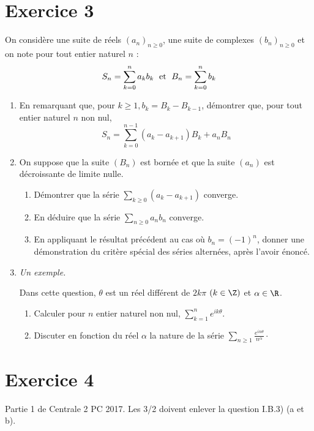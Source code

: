 \documentclass[a4paper,french,11pt,twoside]{VcCours}
\begin{document}
\medskip

\section*{Exercice 3}
On considère une suite de réels $(a_n)_{n \geq 0}$, une suite de complexes $(b_n)_{n \geq 0}$ et on note pour tout entier naturel $n$ :
   $$S_n=\sum_{k=0}^n a_kb_k \; \hbox{ et } \; B_n=\sum_{k=0}^n b_k$$
   \begin{enumerate}
\item En remarquant que, pour $k \geq 1, b_k=B_k-B_{k-1}$, démontrer que, pour tout entier naturel $n$ non nul,
   $$S_n=\sum_{k=0}^{n-1}(a_k-a_{k+1})B_k + a_n B_n$$ 
\item On suppose que la suite $(B_n)$ est bornée et que la suite $(a_n)$ est décroissante de limite nulle.
\begin{enumerate}
\item Démontrer que la série $\sum_{k \geq 0} (a_k-a_{k+1})$ converge.
\item En déduire que la série $\sum_{n \geq 0} a_nb_n$ converge.
\item En appliquant le résultat précédent au cas o\`u $b_n=(-1)^n$, donner une démonstration du critère spécial des séries
    alternées, après l'avoir énoncé.
    \end{enumerate}
\item \textit{Un exemple.}

\noindent Dans cette question, $\theta$ est un réel différent de $2k\pi$ $(k\in \Z)$ et $\alpha \in \R$.
\begin{enumerate}
\item Calculer pour $n$ entier naturel non nul, $\sum_{k=1}^n e^{ik\theta}.$
\item Discuter en fonction du réel $\alpha$ la nature de la série $\sum_{n \geq 1} \frac{e^{in\theta}}{n^{\alpha}} \cdot$
   \end{enumerate}
   \end{enumerate}
   
\section*{Exercice 4}
Partie 1 de Centrale 2 PC 2017. Les 3/2 doivent enlever la question I.B.3) (a et b).
\end{document}

